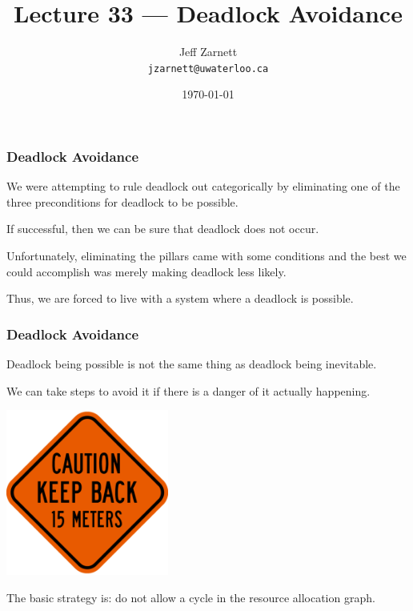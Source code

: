 

\title{Lecture 33 --- Deadlock Avoidance }

\author{Jeff Zarnett \\ \small \texttt{jzarnett@uwaterloo.ca}}
\date{\today}




\begin{frame}
	\titlepage

\end{frame}

\begin{frame}
	\frametitle{Deadlock Avoidance}

	We were attempting to rule deadlock out categorically by eliminating one of the three preconditions for deadlock to be possible.

	If successful, then we can be sure that deadlock does not occur.

	Unfortunately, eliminating the pillars came with some conditions and the best we could accomplish was merely making deadlock less likely.

	Thus, we are forced to live with a system where a deadlock is possible.
\end{frame}


\begin{frame}
	\frametitle{Deadlock Avoidance}

	Deadlock being possible is not the same thing as deadlock being inevitable.

	We can take steps to avoid it if there is a danger of it actually happening.

	\begin{center}
		\includegraphics[width=0.4\textwidth]{images/keepback.png}
	\end{center}

	The basic strategy is: do not allow a cycle in the resource allocation graph.


\end{frame}

